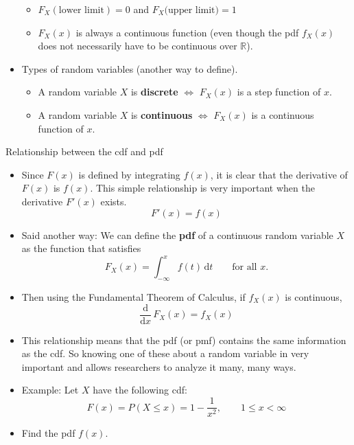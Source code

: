 \documentclass{article}
\newcommand{\integral}[4]{\displaystyle \int_{#1}^{#2} #3 \,\mathrm{d} #4}		%
\newcommand{\ddx}[1]{\frac{\mathrm{d}}{\mathrm{d} #1}\,}		%
\begin{document}
\begin{itemize}
\begin{itemize}
        \item $F_X(\text{lower limit}) = 0$ and $F_X(\text{upper limit)} = 1$
        \item $F_X(x)$ is always a continuous function (even though the pdf $f_X(x)$ does not necessarily have to be continuous over $\mathbb{R}$).
    \end{itemize}\bigskip
    \item Types of random variables (another way to define).
    \begin{itemize}
        \item A random variable $X$ is \textbf{discrete} $\Longleftrightarrow$ $F_X(x)$ is a step function of $x$.
        \item A random variable $X$ is \textbf{continuous} $\Longleftrightarrow$ $F_X(x)$ is a continuous function of $x$.
    \end{itemize}
\end{itemize}\bigskip

Relationship between the cdf and pdf\bigskip
\begin{itemize}
    \item Since $F(x)$ is defined by integrating $f(x)$, it is clear that the derivative of $F(x)$ is $f(x)$. This simple relationship is very important when the derivative $F'(x)$ exists.
    \[F'(x) = f(x)\]
    \item Said another way: We can define the \textbf{pdf} of a continuous random variable $X$ as the function that satisfies
    \[F_X(x) = \integral{-\infty}{x}{f(t)}{t} \quad\quad \text{for all } x.\]
    \item[] Then using the Fundamental Theorem of Calculus, if $f_X(x)$ is continuous,
    \[\ddx{x} F_X(x) = f_X(x)\]
    \item This relationship means that the pdf (or pmf) contains the same information as the cdf. So knowing one of these about a random variable in very important and allows researchers to analyze it many, many ways.
    \item Example: Let $X$ have the following cdf:
    \[F(x) = P(X \le x) = 1 - \frac{1}{x^2}, \quad\quad 1 \le x < \infty\]
    \item[] Find the pdf $f(x)$.\vspace{100pt}
\end{itemize}\bigskip
\end{document}
